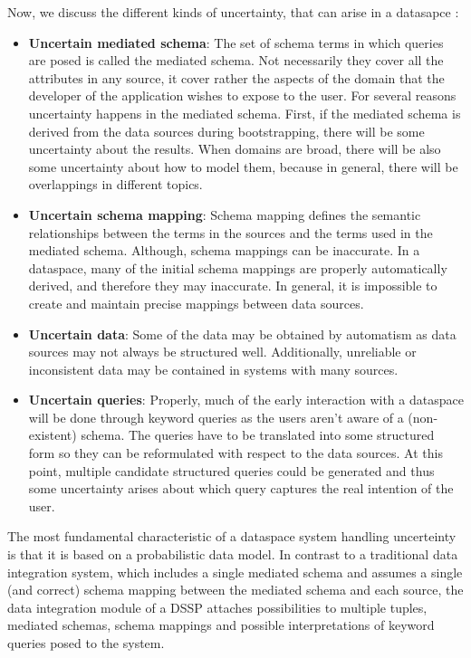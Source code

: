 Now, we discuss the different kinds of uncertainty, that can arise in a datasapce \cite[p. 123]{DBLP:conf/birthday/SarmaDH09}:

\begin{itemize}
\item \textbf{Uncertain mediated schema}: The set of schema terms in which queries are posed is called the mediated schema. Not necessarily they cover all the attributes in any source, it cover rather the aspects of the domain that the developer of the application wishes to expose to the user. For several reasons uncertainty happens in the mediated schema. First, if the mediated schema is derived from the data sources during bootstrapping, there will be some uncertainty about the results. When domains are broad, there will be also some uncertainty about how to model them, because in general, there will be overlappings in different topics. 

\item \textbf{Uncertain schema mapping}: Schema mapping defines the semantic relationships between the terms in the sources and the terms used in the mediated schema. Although, schema mappings can be inaccurate. In a dataspace, many of the initial schema mappings are properly automatically derived, and therefore they may inaccurate. In general, it is impossible to create and maintain precise mappings between data sources. 

\item \textbf{Uncertain data}: Some of the data may be obtained by automatism as data sources may not always be structured well. Additionally, unreliable or inconsistent data may be contained in systems with many sources.

\item \textbf{Uncertain queries}: Properly, much of the early interaction with a dataspace will be done through keyword queries as the users aren't aware of a (non-existent) schema. The queries have to be translated into some structured form so they can be reformulated with respect to the data sources. At this point, multiple candidate structured queries could be generated and thus some uncertainty arises about which query captures the real intention of the user.
\end{itemize} 

The most fundamental characteristic of a dataspace system handling uncerteinty is that it is based on a probabilistic data model. In contrast to a traditional data integration system, which includes a single mediated schema and assumes a single (and correct) schema mapping between the mediated schema and each source, the data integration module of a DSSP attaches possibilities to multiple tuples, mediated schemas, schema mappings and possible interpretations of  keyword queries posed to the system. 

